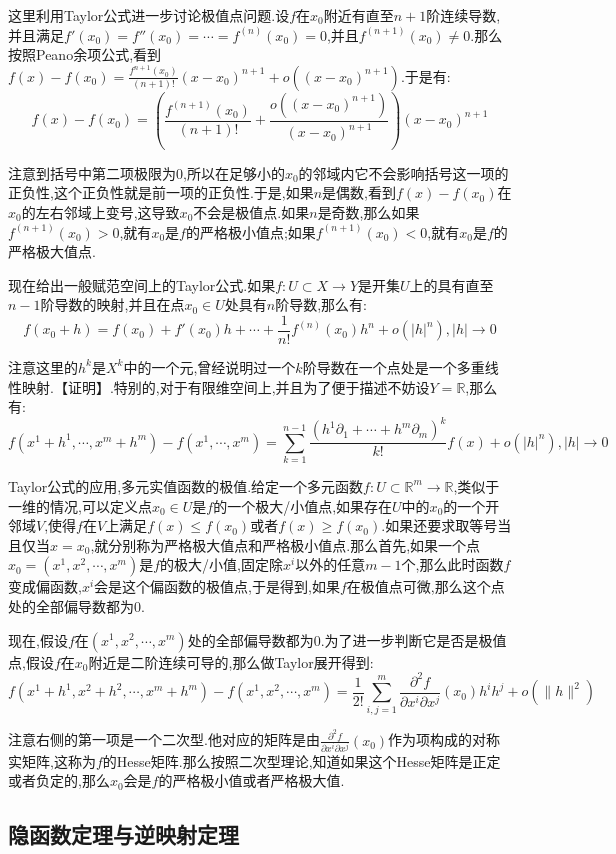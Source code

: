 这里利用Taylor公式进一步讨论极值点问题.设$f$在$x_0$附近有直至$n+1$阶连续导数,并且满足$f'(x_0)=f''(x_0)=\cdots=f^{(n)}(x_0)=0$,并且$f^{(n+1)}(x_0)\not=0$.那么按照Peano余项公式,看到$f(x)-f(x_0)=\frac{f^{n+1}(x_0)}{(n+1)!}(x-x_0)^{n+1}+o((x-x_0)^{n+1})$.于是有:
$$f(x)-f(x_0)=\left(\frac{f^{(n+1)}(x_0)}{(n+1)!}+\frac{o((x-x_0)^{n+1})}{(x-x_0)^{n+1}}\right)(x-x_0)^{n+1}$$

注意到括号中第二项极限为0,所以在足够小的$x_0$的邻域内它不会影响括号这一项的正负性,这个正负性就是前一项的正负性.于是,如果$n$是偶数,看到$f(x)-f(x_0)$在$x_0$的左右邻域上变号,这导致$x_0$不会是极值点.如果$n$是奇数,那么如果$f^{(n+1)}(x_0)>0$,就有$x_0$是$f$的严格极小值点;如果$f^{(n+1)}(x_0)<0$,就有$x_0$是$f$的严格极大值点.

现在给出一般赋范空间上的Taylor公式.如果$f:U\subset X\to Y$是开集$U$上的具有直至$n-1$阶导数的映射,并且在点$x_0\in U$处具有$n$阶导数,那么有:
$$f(x_0+h)=f(x_0)+f'(x_0)h+\cdots+\frac{1}{n!}f^{(n)}(x_0)h^n+o(|h|^n),|h|\to0$$

注意这里的$h^k$是$X^k$中的一个元,曾经说明过一个$k$阶导数在一个点处是一个多重线性映射.【证明】.特别的,对于有限维空间上,并且为了便于描述不妨设$Y=\mathbb{R}$,那么有:
$$f(x^1+h^1,\cdots,x^m+h^m)-f(x^1,\cdots,x^m)=\sum_{k=1}^{n-1}\frac{(h^1\partial_1+\cdots+h^m\partial_m)^k}{k!}f(x)+o(|h|^n),|h|\to0$$

Taylor公式的应用,多元实值函数的极值.给定一个多元函数$f:U\subset\mathbb{R}^m\to\mathbb{R}$,类似于一维的情况,可以定义点$x_0\in U$是$f$的一个极大/小值点,如果存在$U$中的$x_0$的一个开邻域$V$,使得$f$在$V$上满足$f(x)\le f(x_0)$或者$f(x)\ge f(x_0)$.如果还要求取等号当且仅当$x=x_0$,就分别称为严格极大值点和严格极小值点.那么首先,如果一个点$x_0=(x^1,x^2,\cdots,x^m)$是$f$的极大/小值,固定除$x^i$以外的任意$m-1$个,那么此时函数$f$变成偏函数,$x^i$会是这个偏函数的极值点,于是得到,如果$f$在极值点可微,那么这个点处的全部偏导数都为0.

现在,假设$f$在$(x^1,x^2,\cdots,x^m)$处的全部偏导数都为0.为了进一步判断它是否是极值点,假设$f$在$x_0$附近是二阶连续可导的,那么做Taylor展开得到:
$$f(x^1+h^1,x^2+h^2,\cdots,x^m+h^m)-f(x^1,x^2,\cdots,x^m)=\frac{1}{2!}\sum_{i,j=1}^m\frac{\partial^2f}{\partial x^i\partial x^j}(x_0)h^ih^j+o(\|h\|^2)$$

注意右侧的第一项是一个二次型.他对应的矩阵是由$\frac{\partial^2f}{\partial x^i\partial x^j}(x_0)$作为项构成的对称实矩阵,这称为$f$的Hesse矩阵.那么按照二次型理论,知道如果这个Hesse矩阵是正定或者负定的,那么$x_0$会是$f$的严格极小值或者严格极大值.
\newpage
\subsection{隐函数定理与逆映射定理}

